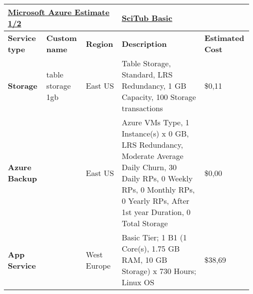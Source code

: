 %

\begin{landscape}
\begin{table}[]
\begin{tabularx}{\linewidth}{|l|X|X|X|X|}        %
\hline
\multicolumn{3}{|l|}{{\ul \textbf{Microsoft Azure Estimate 1/2}}}                     & {\ul \textbf{SciTub Basic}}                                                                                                                                                                                                                      & {\ul \textbf{}}                          \\ \hline
\textbf{Service type}             & \textbf{Custom name}      & \textbf{Region} & \textbf{Description}                                                                                                                                                                                                                             & \textbf{Estimated Cost}                  \\ \hline\hline
\textbf{Storage}                  & table storage 1gb         & East US         & Table Storage, Standard, LRS Redundancy, 1 GB Capacity, 100 Storage transactions                                                                                                                                                                 & \$0,11                                   \\ \hline
\textbf{Azure Backup}             &                           & East US         & Azure VMs Type, 1 Instance(s) x 0 GB, LRS Redundancy, Moderate Average Daily Churn, 30 Daily RPs, 0 Weekly RPs, 0 Monthly RPs, 0 Yearly RPs,  After 1st year Duration, 0 Total Storage                                                           & \$0,00                                   \\ \hline
\textbf{App Service}              &                           & West Europe     & Basic Tier; 1 B1 (1 Core(s), 1.75 GB RAM, 10 GB Storage) x 730 Hours; Linux OS                                                                                                                                                                   & \$38,69                                  \\ \hline

\end{tabularx}
\end{table}
\end{landscape}
